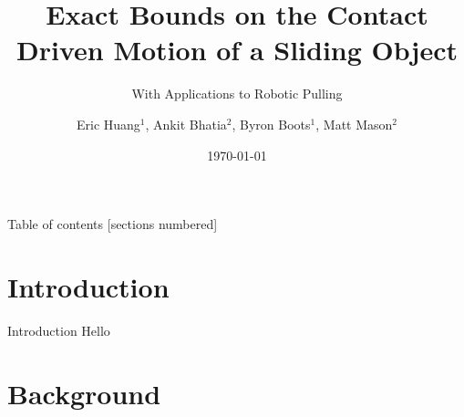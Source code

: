 \documentclass[10pt]{beamer}
\title{Exact Bounds on the Contact Driven Motion of a Sliding Object}
\subtitle{With Applications to Robotic Pulling}
\date{\today}
\author{Eric Huang$^1$, Ankit Bhatia$^2$, Byron Boots$^1$, Matt Mason$^2$}
\institute{$^1$Georgia Institute of Technology, $^2$Carnegie Mellon University}
\begin{document}
\maketitle

\begin{frame}{Table of contents}
  [sections numbered]
  \tableofcontents[hideallsubsections]
\end{frame}

\section{Introduction}

\begin{frame}{Introduction}
  Hello
\end{frame}

\section{Background}
\end{document}
